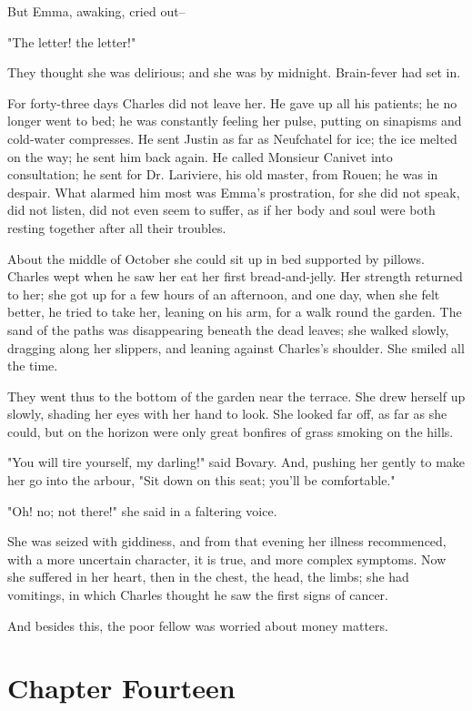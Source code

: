 \documentclass{tufte-book}
\begin{document}
But Emma, awaking, cried out--

"The letter! the letter!"

They thought she was delirious; and she was by midnight. Brain-fever had
set in.

For forty-three days Charles did not leave her. He gave up all his
patients; he no longer went to bed; he was constantly feeling her pulse,
putting on sinapisms and cold-water compresses. He sent Justin as far as
Neufchatel for ice; the ice melted on the way; he sent him back again.
He called Monsieur Canivet into consultation; he sent for Dr. Lariviere,
his old master, from Rouen; he was in despair. What alarmed him most was
Emma's prostration, for she did not speak, did not listen, did not even
seem to suffer, as if her body and soul were both resting together after
all their troubles.

About the middle of October she could sit up in bed supported by
pillows. Charles wept when he saw her eat her first bread-and-jelly. Her
strength returned to her; she got up for a few hours of an afternoon,
and one day, when she felt better, he tried to take her, leaning on his
arm, for a walk round the garden. The sand of the paths was disappearing
beneath the dead leaves; she walked slowly, dragging along her slippers,
and leaning against Charles's shoulder. She smiled all the time.

They went thus to the bottom of the garden near the terrace. She drew
herself up slowly, shading her eyes with her hand to look. She looked
far off, as far as she could, but on the horizon were only great
bonfires of grass smoking on the hills.

"You will tire yourself, my darling!" said Bovary. And, pushing her
gently to make her go into the arbour, "Sit down on this seat; you'll be
comfortable."

"Oh! no; not there!" she said in a faltering voice.

She was seized with giddiness, and from that evening her illness
recommenced, with a more uncertain character, it is true, and more
complex symptoms. Now she suffered in her heart, then in the chest, the
head, the limbs; she had vomitings, in which Charles thought he saw the
first signs of cancer.

And besides this, the poor fellow was worried about money matters.



\chapter{Chapter Fourteen}
\end{document}
